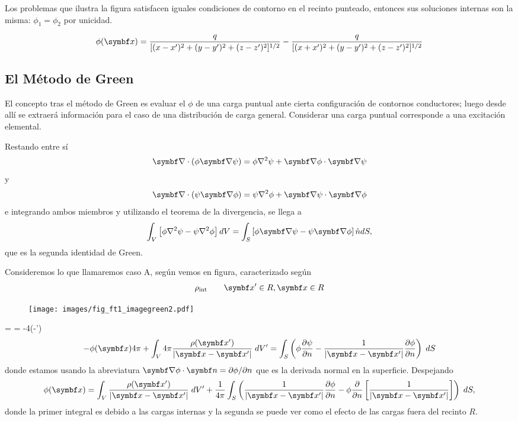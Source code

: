 \documentclass[10pt,oneside]{CBFT_book}
\begin{document}
Los problemas que ilustra la figura satisfacen iguales condiciones de contorno en el recinto punteado,
entonces sus soluciones internas son la misma: $\phi_1 = \phi_2$ por unicidad.

\[
	\phi(\vb{x}) = \frac{q}{[ (x-x')^2 + (y-y')^2 + (z-z')^2 ]^{1/2}} - 
	\frac{q}{[ (x+x')^2 + (y-y')^2 + (z-z')^2 ]^{1/2}}
\]

\subsection{El Método de Green}

El concepto tras el método de Green es evaluar el $\phi$ de una carga puntual ante cierta configuración
de contornos conductores; luego desde allí se extraerá información para el caso de una distribución de
carga general. Considerar una carga puntual corresponde a una excitación elemental.

Restando entre sí
\[
	\Nabla\cdot(\phi\Nabla\psi) = \phi\lapm{\psi} + \Nabla\phi\cdot\Nabla\psi
\]
y
\[
	\Nabla\cdot(\psi\Nabla\phi) = \psi\lapm{\phi} + \Nabla\psi\cdot\Nabla\phi
\]
e integrando ambos miembros y utilizando el teorema de la divergencia, se llega a
\[
	\int_V \left[ \phi\lapm{\psi} - \psi\lapm{\phi}\right] dV =
	\int_S \left[ \phi\Nabla\psi - \psi\Nabla\phi \right] \hat{n} dS,
\]
que es la segunda identidad de Green.

Consideremos lo que llamaremos caso A, según vemos en figura, caracterizado según
\[
	\rho_{\text{int}} \qquad \vb{x}'\in R, \vb{x}\in R
\]
\begin{figure}[htb]
	\begin{center}
	\texttt{[image: images/fig\_ft1\_imagegreen2.pdf]}	 
	\end{center}
	\caption{}
\end{figure} 
\be
	\psi =  \qquad \lapm{\psi} = -4\pi \delta(-')
	\label{laplace_eq}
\ee
\[
	-\phi(\vb{x})4\pi + \int_V 4\pi \frac{\rho(\vb{x}')}{|\vb{x}-\vb{x}'|} \; dV' =
	\int_S \left( \phi\dpar{\psi}{n}-\frac{1}{|\vb{x}-\vb{x}'|}\dpar{\phi}{n}\right)\; dS 
\]
donde estamos usando la abreviatura $\Nabla\phi\cdot\vb{n}=\partial\phi/\partial n$ que es la
derivada normal en la superficie. Despejando
\[
	\phi(\vb{x}) = \int_V \frac{\rho(\vb{x}')}{|\vb{x}-\vb{x}'|} \; dV' +
	\frac{1}{4\pi} \int_S \left( \frac{1}{|\vb{x}-\vb{x}'|}\dpar{\phi}{n} -
	\phi\frac{\partial}{\partial n} \left[\frac{1}{|\vb{x}-\vb{x}'|} \right] \right)\; dS ,
\]
donde la primer integral es debido a las cargas internas y la segunda se puede ver como el efecto
de las cargas fuera del recinto $ R $. 
\end{document}
